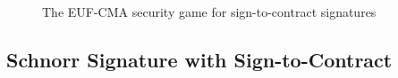 \begin{figure}[tbh]
  \begin{tcolorbox}
    \begin{pchstack}[center]
      \pchspace
    \end{pchstack}
  \end{tcolorbox}
  \caption{The EUF-CMA security game for sign-to-contract signatures}
  \label{fig:euf-cma-s2c}
\end{figure}

\begin{definition}\label{def:euf-cma-s2c}
\end{definition}


\subsection{Schnorr Signature with Sign-to-Contract}

